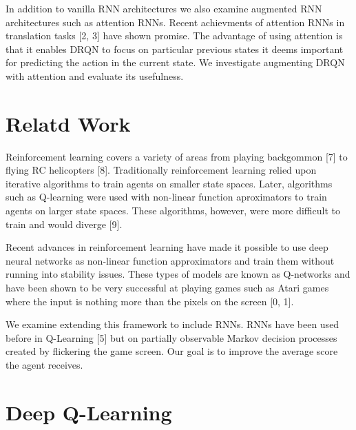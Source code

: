 \documentclass{article}
\begin{document}
    In addition to vanilla RNN architectures we also examine augmented RNN
    architectures such as attention RNNs. Recent achievments of attention RNNs in
    translation tasks [2, 3] have shown promise. The advantage of using attention
    is that it enables DRQN to focus on particular previous states it deems
    important for predicting the action in the current state. We investigate
    augmenting DRQN with attention and evaluate its usefulness.

\section{Relatd Work}

Reinforcement learning covers a variety of areas from playing backgommon [7] to
flying RC helicopters [8]. Traditionally reinforcement learning relied upon
iterative algorithms to train agents on smaller state spaces. Later, algorithms
such as Q-learning were used with non-linear function aproximators to train agents
on larger state spaces. These algorithms, however, were more difficult to train
and would diverge [9].

Recent advances in reinforcement learning have made it possible to use deep
neural networks as non-linear function approximators and train them without
running into stability issues. These types of models are known as Q-networks and
have been shown to be very successful at playing games such as Atari games where
the input is nothing more than the pixels on the screen [0, 1].

We examine extending this framework to include RNNs. RNNs have been used before
in Q-Learning [5] but on partially observable Markov decision processes created
by flickering the game screen. Our goal is to improve the average score the agent
receives.

\section{Deep Q-Learning}
\end{document}
